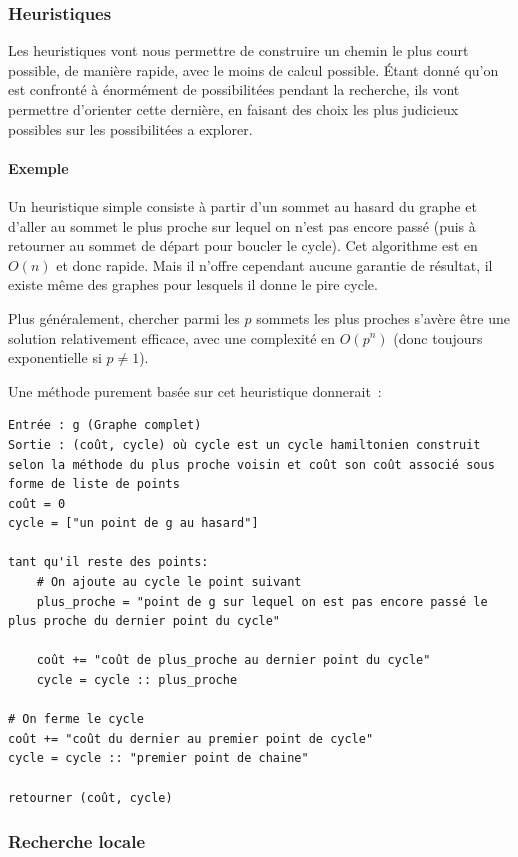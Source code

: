   \subsubsection{Heuristiques}

    Les heuristiques vont nous permettre de construire un chemin le plus court
    possible, de manière rapide, avec le moins de calcul possible.
    Étant donné qu'on est confronté à énormément de possibilitées pendant
    la recherche, ils vont permettre d'orienter cette dernière, en faisant
    des choix les plus judicieux possibles sur les possibilitées a explorer.

    \paragraph{Exemple} Un heuristique simple consiste à partir d'un sommet au hasard du graphe et
    d'aller au sommet le plus proche sur lequel on n'est pas encore passé (puis
    à retourner au sommet de départ pour boucler le cycle). Cet algorithme est
    en $O(n)$ et donc rapide. Mais il n'offre cependant aucune garantie de
    résultat, il existe même des graphes pour lesquels il donne le pire cycle.

    Plus généralement, chercher parmi les $p$ sommets les plus proches s'avère
    être une solution relativement efficace, avec une complexité en $O(p^n)$
    (donc toujours exponentielle si $p \neq 1$).

    Une méthode purement basée sur cet heuristique donnerait~:

    \begin{lstlisting}
Entrée : g (Graphe complet)
Sortie : (coût, cycle) où cycle est un cycle hamiltonien construit selon la méthode du plus proche voisin et coût son coût associé sous forme de liste de points
coût = 0
cycle = ["un point de g au hasard"]

tant qu'il reste des points:
    # On ajoute au cycle le point suivant
    plus_proche = "point de g sur lequel on est pas encore passé le plus proche du dernier point du cycle"

    coût += "coût de plus_proche au dernier point du cycle"
    cycle = cycle :: plus_proche

# On ferme le cycle
coût += "coût du dernier au premier point de cycle"
cycle = cycle :: "premier point de chaine"

retourner (coût, cycle)
    \end{lstlisting}

  \subsubsection{Recherche locale}

